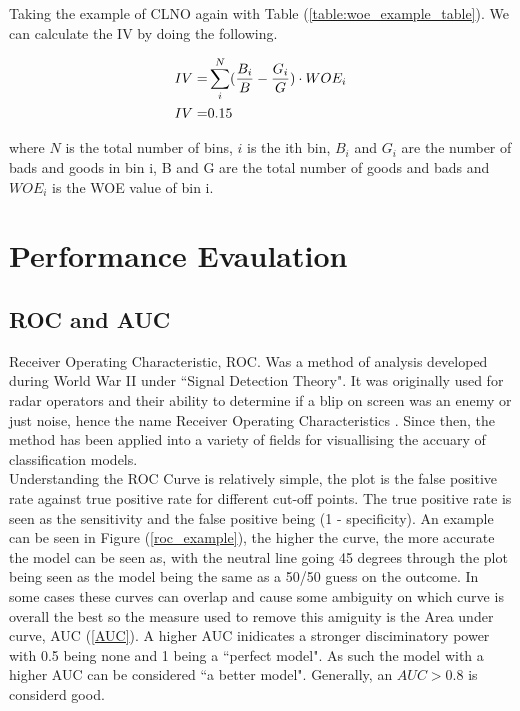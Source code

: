 Taking the example of CLNO again with Table (\ref{table:woe_example_table}). We can calculate the IV by doing the following.

\begin{equation}\label{IV_Example}
\begin{aligned}
IV =& \sum_{i}^{N} (\dfrac{B_{i}}{B} - \dfrac{G_{i}}{G}) \cdot \textup{$WOE_{i}$} \\
IV =& 0.15
\end{aligned}
\end{equation}

where $N$ is the total number of bins, $i$ is the ith bin, $B_{i}$ and $G_{i}$ are the number of bads and goods in bin i, B and G are the total number of goods and bads and $WOE_{i}$  is the WOE value of bin i.

\section{Performance Evaulation} \label{sec:perf_eval}

\subsection*{ROC and AUC}
Receiver Operating Characteristic, ROC. Was a method of analysis developed during World War II under ``Signal Detection Theory". It was originally used for radar operators and their ability to determine if a blip on screen was an enemy or just noise, hence the name Receiver Operating Characteristics \parencite{tape2000using}. Since then, the method has been applied into a variety of fields for visuallising the accuary of classification models. \\

Understanding the ROC Curve is relatively simple, the plot is the false positive rate against true positive rate for different cut-off points. The true positive rate is seen as the sensitivity and the false positive being (1 - specificity). An example can be seen in Figure (\ref{roc_example}), the higher the curve, the more accurate the model can be seen as, with the neutral line going 45 degrees through the plot being seen as the model being the same as a 50/50 guess on the outcome. In some cases these curves can overlap and cause some ambiguity on which curve is overall the best so the measure used to remove this amiguity is the Area under curve, AUC (\ref{AUC}). A higher AUC inidicates a stronger disciminatory power with 0.5 being none and 1 being a ``perfect model". As such the model with a higher AUC can be considered ``a better model". Generally, an $AUC > 0.8$ is considerd good.

